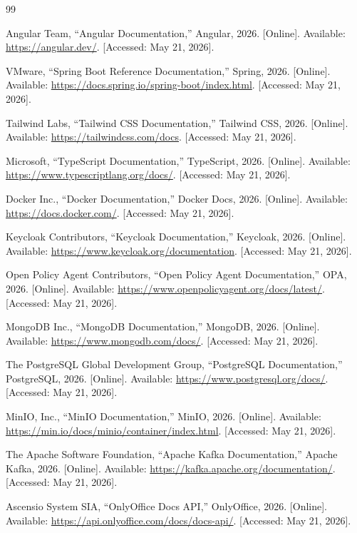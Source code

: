 \renewcommand{\bibname}{Webography}
\begin{thebibliography}{99}
\setcounter{enumiv}{8}

Angular Team, ``Angular Documentation,'' Angular, 2026. [Online]. Available: \url{https://angular.dev/}. [Accessed: May 21, 2026].

VMware, ``Spring Boot Reference Documentation,'' Spring, 2026. [Online]. Available: \url{https://docs.spring.io/spring-boot/index.html}. [Accessed: May 21, 2026].

Tailwind Labs, ``Tailwind CSS Documentation,'' Tailwind CSS, 2026. [Online]. Available: \url{https://tailwindcss.com/docs}. [Accessed: May 21, 2026].

Microsoft, ``TypeScript Documentation,'' TypeScript, 2026. [Online]. Available: \url{https://www.typescriptlang.org/docs/}. [Accessed: May 21, 2026].

Docker Inc., ``Docker Documentation,'' Docker Docs, 2026. [Online]. Available: \url{https://docs.docker.com/}. [Accessed: May 21, 2026].

Keycloak Contributors, ``Keycloak Documentation,'' Keycloak, 2026. [Online]. Available: \url{https://www.keycloak.org/documentation}. [Accessed: May 21, 2026].

Open Policy Agent Contributors, ``Open Policy Agent Documentation,'' OPA, 2026. [Online]. Available: \url{https://www.openpolicyagent.org/docs/latest/}. [Accessed: May 21, 2026].

MongoDB Inc., ``MongoDB Documentation,'' MongoDB, 2026. [Online]. Available: \url{https://www.mongodb.com/docs/}. [Accessed: May 21, 2026].

The PostgreSQL Global Development Group, ``PostgreSQL Documentation,'' PostgreSQL, 2026. [Online]. Available: \url{https://www.postgresql.org/docs/}. [Accessed: May 21, 2026].

MinIO, Inc., ``MinIO Documentation,'' MinIO, 2026. [Online]. Available: \url{https://min.io/docs/minio/container/index.html}. [Accessed: May 21, 2026].

The Apache Software Foundation, ``Apache Kafka Documentation,'' Apache Kafka, 2026. [Online]. Available: \url{https://kafka.apache.org/documentation/}. [Accessed: May 21, 2026].

Ascensio System SIA, ``OnlyOffice Docs API,'' OnlyOffice, 2026. [Online]. Available: \url{https://api.onlyoffice.com/docs/docs-api/}. [Accessed: May 21, 2026].


\end{thebibliography}
